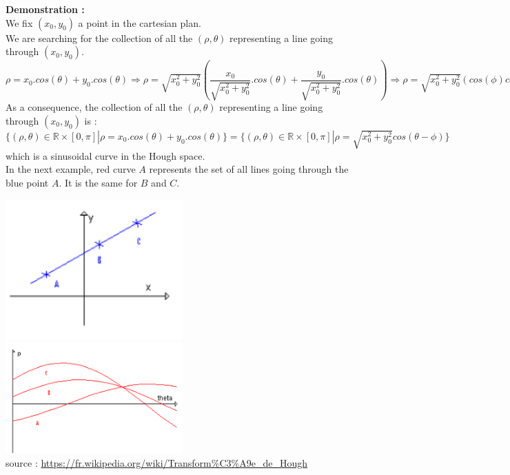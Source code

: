 \documentclass{article}
\begin{document}
\textbf{Demonstration :}\\
We fix $(x_0, y_0)$ a point in the cartesian plan. \\
We are searching for the collection of all the $(\rho, \theta)$ representing a line going through $(x_0, y_0)$.\\
$\rho = x_0.cos(\theta)+y_0.cos(\theta) \Rightarrow \rho = \sqrt{x_0^2 + y_0^2}(\dfrac{x_0}{\sqrt{x_0^2 + y_0^2}}.cos(\theta)+\dfrac{y_0}{\sqrt{x_0^2 + y_0^2}}.cos(\theta)) \Rightarrow \rho = \sqrt{x_0^2 + y_0^2}(cos(\phi)cos(\theta)+sin(\phi)sin(\theta)) \Rightarrow \rho = \sqrt{x_0^2 + y_0^2} cos(\theta - \phi)$\\
As a consequence,  the collection of all the $(\rho, \theta)$ representing a line going through $(x_0, y_0)$ is :\\
$\lbrace (\rho, \theta) \in \mathbb{R} \times [0, \pi] | \rho =  x_0.cos(\theta)+y_0.cos(\theta) \rbrace = \lbrace (\rho, \theta) \in \mathbb{R} \times [0, \pi] | \rho =  \sqrt{x_0^2 + y_0^2} cos(\theta - \phi) \rbrace$
which is a sinusoidal curve in the Hough space.\\


In the next example, red curve $A$ represents the set of all lines going through the blue point $A$. It is the same for $B$ and $C$.


\includegraphics[width=6.8cm]{images/img18.png} 
\includegraphics[width=6.8cm]{images/img19.png}\\
source : \url{https://fr.wikipedia.org/wiki/Transform%C3%A9e_de_Hough}\\
\end{document}
